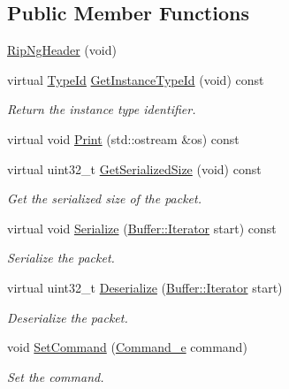 \subsection*{Public Member Functions}
\begin{DoxyCompactItemize}
\item 
\hyperlink{classns3_1_1RipNgHeader_a51cf4a47a5457aff457019f7dbbc2a43}{Rip\+Ng\+Header} (void)
\item 
virtual \hyperlink{classns3_1_1TypeId}{Type\+Id} \hyperlink{classns3_1_1RipNgHeader_a3673b0765c12a3246a7ea0ded7bd23ad}{Get\+Instance\+Type\+Id} (void) const 
\begin{DoxyCompactList}\small\item\em Return the instance type identifier. \end{DoxyCompactList}\item 
virtual void \hyperlink{classns3_1_1RipNgHeader_ae04251ddeb9ef23fab0ec1ca986ecdb3}{Print} (std\+::ostream \&os) const 
\item 
virtual uint32\+\_\+t \hyperlink{classns3_1_1RipNgHeader_a2cfa886dd98ee0018de0391bde12d8a3}{Get\+Serialized\+Size} (void) const 
\begin{DoxyCompactList}\small\item\em Get the serialized size of the packet. \end{DoxyCompactList}\item 
virtual void \hyperlink{classns3_1_1RipNgHeader_ab37ce2d9eccbd2e8776ee2d75044064c}{Serialize} (\hyperlink{classns3_1_1Buffer_1_1Iterator}{Buffer\+::\+Iterator} start) const 
\begin{DoxyCompactList}\small\item\em Serialize the packet. \end{DoxyCompactList}\item 
virtual uint32\+\_\+t \hyperlink{classns3_1_1RipNgHeader_ab6bd6911230599868747821f94e65588}{Deserialize} (\hyperlink{classns3_1_1Buffer_1_1Iterator}{Buffer\+::\+Iterator} start)
\begin{DoxyCompactList}\small\item\em Deserialize the packet. \end{DoxyCompactList}\item 
void \hyperlink{classns3_1_1RipNgHeader_a3960f8da70fe2d21b867770b8a47b2cc}{Set\+Command} (\hyperlink{classns3_1_1RipNgHeader_ad96724d6f6fdb4ffa22fe71a0ff12bd2}{Command\+\_\+e} command)
\begin{DoxyCompactList}\small\item\em Set the command. \end{DoxyCompactList}\item 

\end{DoxyCompactItemize}
